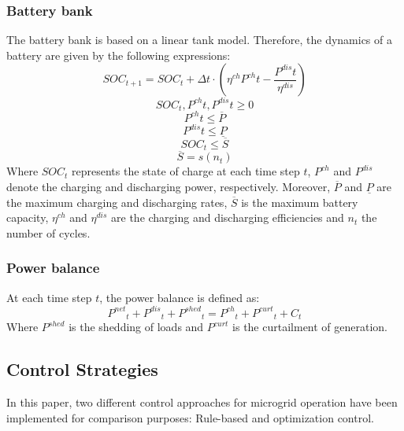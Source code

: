 \documentclass{ECOS_2019}
\begin{document}
\subsubsection{Battery bank}
The battery bank is based on a linear tank model. Therefore, the dynamics of a battery are given by the following expressions\cite{Totaro2021}:
\begin{equation}
    SOC_{t+1} = SOC_{t}+\Delta t\cdot (\eta^{ch}P^{ch}t-\frac{P^{dis}t}{\eta^{dis}})
\end{equation}
\begin{equation}
    SOC_{t},P^{ch}t,P^{dis}t\geq0
\end{equation}
\begin{equation}
    P^{ch}t\leq\overline{P}
\end{equation}
\begin{equation}
    P^{dis}t\leq\underline{P}
\end{equation}
\begin{equation}
    SOC_{t}\leq\overline{S}
\end{equation}
\begin{equation}
    \overline{S}=s(n_t)
\end{equation}
Where $SOC_t$ represents the state of charge at each time step $t$, $P^{ch}$ and $P^{dis}$ denote the charging and discharging power, respectively. Moreover, $\overline{P}$ and $\underline{P}$ are the maximum charging and discharging rates, $\overline{S}$ is the maximum battery capacity, $\eta^{ch}$ and $\eta^{dis}$ are the charging and discharging efficiencies and $n_t$ the number of cycles.
\subsubsection{Power balance}
At each time step $t$, the power balance is defined as\cite{Totaro2021}:
\begin{equation}
    {P^{net}}_t+{P^{dis}}_t+{P^{shed}}_t={P^{ch}}_t+{P^{curt}}_t+C_{t}
\end{equation}
Where $P^{shed}$ is the shedding of loads and $P^{curt}$ is the curtailment of generation.
\subsection{Control Strategies}
In this paper, two different control approaches for microgrid operation have been implemented for comparison purposes: Rule-based and optimization control.
\end{document}
